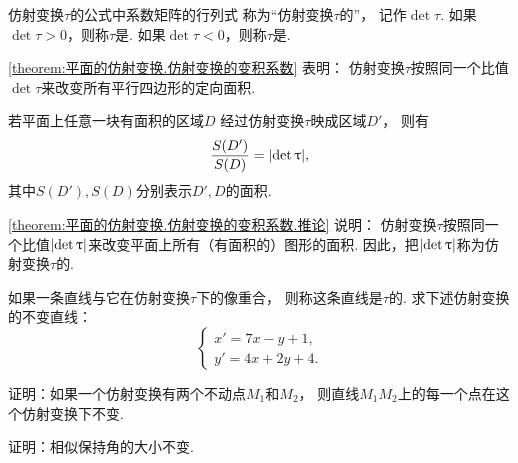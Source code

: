 \begin{definition}
仿射变换\(\tau\)的公式中系数矩阵的行列式
称为“仿射变换\(\tau\)的”，
记作\(\det\tau\).
如果\(\det\tau>0\)，则称\(\tau\)是.
如果\(\det\tau<0\)，则称\(\tau\)是.
\end{definition}

\cref{theorem:平面的仿射变换.仿射变换的变积系数} 表明：
仿射变换\(\tau\)按照同一个比值\(\det\tau\)来改变所有平行四边形的定向面积.

\begin{corollary}\label{theorem:平面的仿射变换.仿射变换的变积系数.推论}
若平面上任意一块有面积的区域\(D\)
经过仿射变换\(\tau\)映成区域\(D'\)，
则有\begin{equation*}
	\frac{S(D')}{S(D)} = \abs{\det\uptau},
\end{equation*}
其中\(S(D'),S(D)\)分别表示\(D',D\)的面积.
\end{corollary}

\cref{theorem:平面的仿射变换.仿射变换的变积系数.推论} 说明：
仿射变换\(\tau\)按照同一个比值\(\abs{\det\uptau}\)来改变平面上所有（有面积的）图形的面积.
因此，把\(\abs{\det\uptau}\)称为仿射变换\(\tau\)的.

\begin{example}
如果一条直线与它在仿射变换\(\tau\)下的像重合，
则称这条直线是\(\tau\)的.
求下述仿射变换的不变直线：\begin{equation*}
	\begin{cases}
		x' = 7x - y + 1, \\
		y' = 4x + 2y + 4.
	\end{cases}
\end{equation*}
\end{example}

\begin{example}
证明：如果一个仿射变换有两个不动点\(M_1\)和\(M_2\)，
则直线\(M_1 M_2\)上的每一个点在这个仿射变换下不变.
\end{example}

\begin{example}
证明：相似保持角的大小不变.
\end{example}


